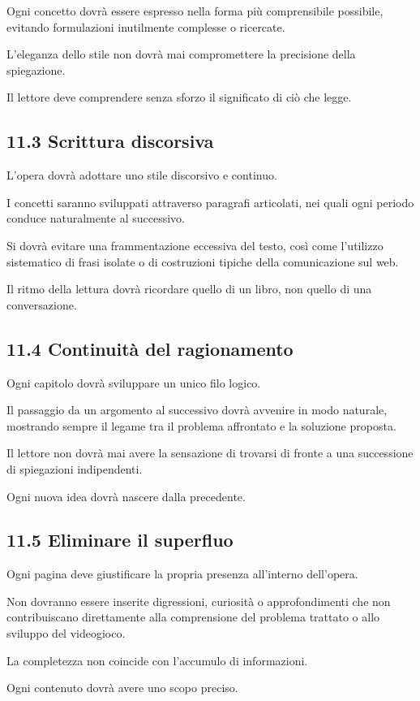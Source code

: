 \documentclass{article}
\begin{document}
Ogni concetto dovrà essere espresso nella forma più comprensibile possibile, evitando formulazioni inutilmente complesse
o ricercate.

L'eleganza dello stile non dovrà mai compromettere la precisione della spiegazione.

Il lettore deve comprendere senza sforzo il significato di ciò che legge.

\subsection{11.3 Scrittura discorsiva}
L'opera dovrà adottare uno stile discorsivo e continuo.

I concetti saranno sviluppati attraverso paragrafi articolati, nei quali ogni periodo conduce naturalmente al
successivo.

Si dovrà evitare una frammentazione eccessiva del testo, così come l'utilizzo sistematico di frasi isolate o di
costruzioni tipiche della comunicazione sul web.

Il ritmo della lettura dovrà ricordare quello di un libro, non quello di una conversazione.

\subsection{11.4 Continuità del ragionamento}
Ogni capitolo dovrà sviluppare un unico filo logico.

Il passaggio da un argomento al successivo dovrà avvenire in modo naturale, mostrando sempre il legame tra il problema
affrontato e la soluzione proposta.

Il lettore non dovrà mai avere la sensazione di trovarsi di fronte a una successione di spiegazioni indipendenti.

Ogni nuova idea dovrà nascere dalla precedente.

\subsection{11.5 Eliminare il superfluo}
Ogni pagina deve giustificare la propria presenza all'interno dell'opera.

Non dovranno essere inserite digressioni, curiosità o approfondimenti che non contribuiscano direttamente alla
comprensione del problema trattato o allo sviluppo del videogioco.

La completezza non coincide con l'accumulo di informazioni.

Ogni contenuto dovrà avere uno scopo preciso.
\end{document}
